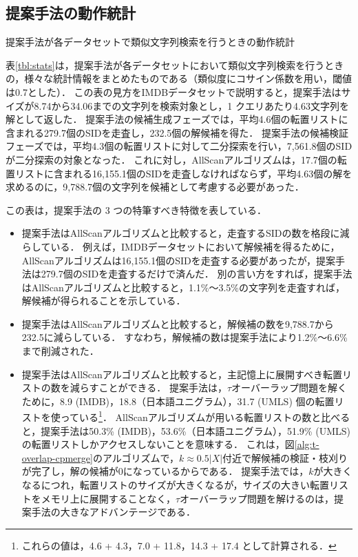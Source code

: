 \documentclass[japanese]{jnlp_JS2.0}
\begin{document}
\subsection{提案手法の動作統計}
\label{sect:cpmerge-stat}

\begin{table}[b]
\caption{提案手法が各データセットで類似文字列検索を行うときの動作統計}
\label{tbl:stats}

\end{table}

表\ref{tbl:stats}は，提案手法が各データセットにおいて類似文字列検索を行うときの，様々な統計情報をまとめたものである（類似度にコサイン係数を用い，閾値は0.7とした）．
この表の見方をIMDBデータセットで説明すると，提案手法はサイズが8.74から34.06までの文字列を検索対象とし，1 クエリあたり4.63文字列を解として返した．
提案手法の候補生成フェーズでは，平均4.6個の転置リストに含まれる279.7個のSIDを走査し，232.5個の解候補を得た．
提案手法の候補検証フェーズでは，平均4.3個の転置リストに対して二分探索を行い，7,561.8個のSIDが二分探索の対象となった．
これに対し，AllScanアルゴリズムは，17.7個の転置リストに含まれる16,155.1個のSIDを走査しなければならず，平均4.63個の解を求めるのに，9,788.7個の文字列を候補として考慮する必要があった．

この表は，提案手法の 3 つの特筆すべき特徴を表している．
\begin{itemize}
\item 提案手法はAllScanアルゴリズムと比較すると，走査するSIDの数を格段に減らしている．
例えば，IMDBデータセットにおいて解候補を得るために，AllScanアルゴリズムは16,155.1個のSIDを走査する必要があったが，提案手法は279.7個のSIDを走査するだけで済んだ．
別の言い方をすれば，提案手法はAllScanアルゴリズムと比較すると，1.1\%〜3.5\%の文字列を走査すれば，解候補が得られることを示している．
\item 提案手法はAllScanアルゴリズムと比較すると，解候補の数を9,788.7から232.5に減らしている．
すなわち，解候補の数は提案手法により1.2\%〜6.6\%まで削減された．
\item 提案手法はAllScanアルゴリズムと比較すると，主記憶上に展開すべき転置リストの数を減らすことができる．
提案手法は，$\tau$オーバーラップ問題を解くために，8.9 (IMDB)，18.8（日本語ユニグラム），31.7 (UMLS) 個の転置リストを使っている\footnote{これらの値は，4.6 + 4.3，7.0 + 11.8，14.3 + 17.4 として計算される．}．
AllScanアルゴリズムが用いる転置リストの数と比べると，提案手法は50.3\% (IMDB)，53.6\%（日本語ユニグラム），51.9\% (UMLS) の転置リストしかアクセスしないことを意味する．
これは，図\ref{alg:t-overlap-cpmerge}のアルゴリズムで，$k \approx 0.5 |X|$付近で解候補の検証・枝刈りが完了し，解の候補が0になっているからである．
提案手法では，$k$が大きくなるにつれ，転置リストのサイズが大きくなるが，サイズの大きい転置リストをメモリ上に展開することなく，$\tau$オーバーラップ問題を解けるのは，提案手法の大きなアドバンテージである．
\end{itemize}
\end{document}
